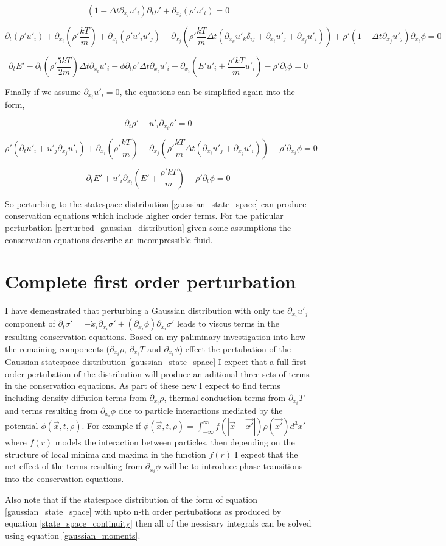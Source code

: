 \documentclass[%
 twocolumn,
 preprint, onecolumn,
 amsmath,amssymb,
 aps,
]{revtex4-1}
\begin{document}
\[
\left(1-\Delta t\partial_{x_i}u'_i\right)\partial_t \rho' + \partial_{x_i}\left(\rho' u'_i\right)=0
\]

\[
\partial_t \left(\rho' u'_i\right) + \partial_{x_i}\left(\rho'\frac{kT}{m}\right) + \partial_{x_j}\left(\rho'u'_iu'_j\right) - \partial_{x_j}\left(\rho'\frac{kT}{m}\Delta t\left(\partial_{x_k}u'_k\delta_{ij} + \partial_{x_i}u'_j + \partial_{x_j}u'_i\right)\right) + \rho'\left(1-\Delta t\partial_{x_j}u'_j\right)\partial_{x_i}\phi = 0
\]

\[
\partial_tE'-\partial_t\left(\rho'\frac{5kT}{2m}\right)\Delta t\partial_{x_i}u'_i-\phi\partial_t\rho'\Delta t\partial_{x_i}u'_i + \partial_{x_i}\left(E'u'_i + \frac{\rho'kT}{m}u'_i\right)-\rho'\partial_t\phi = 0
\]

Finally if we assume $\partial_{x_i}u'_i=0$, the equations can be simplified again into the form,

\[
\partial_t \rho' + u'_i\partial_{x_i}\rho'=0
\]

\[
\rho'\left(\partial_t u'_i + u'_j\partial_{x_j}u'_i\right) + \partial_{x_i}\left(\rho'\frac{kT}{m}\right) - \partial_{x_j}\left(\rho'\frac{kT}{m}\Delta t\left(\partial_{x_i}u'_j + \partial_{x_j}u'_i\right)\right) + \rho'\partial_{x_i}\phi = 0
\]

\[
\partial_tE' + u'_i\partial_{x_i}\left(E' + \frac{\rho'kT}{m}\right)-\rho'\partial_t\phi = 0
\]

So perturbing to the statespace distribution \eqref{gaussian_state_space} can produce conservation equations which include higher order terms. For the paticular perturbation \eqref{perturbed_gaussian_distribution} given some assumptions the conservation equations describe an incompressible fluid.

\section{Complete first order perturbation}
I have demenstrated that perturbing a Gaussian distribution with only the $\partial_{x_i}u'_j$ component of $\partial_t \sigma'=-\dot{x}_i\partial_{x_i}\sigma'+\left(\partial_{x_i}\phi\right)\partial_{\dot{x}_i}\sigma'$ leads to viscus terms in the resulting conservation equations. Based on my paliminary investigation into how the remaining components ($\partial_{x_i}\rho$, $\partial_{x_i}T$ and $\partial_{x_i}\phi$) effect the pertubation of the Gaussian statespace distribution \eqref{gaussian_state_space} I expect that a full first order pertubation of the distribution will produce an aditional three sets of terms in the conservation equations. As part of these new I expect to find terms including density diffution terms from $\partial_{x_i}\rho$, thermal conduction terms from $\partial_{x_i}T$ and terms resulting from $\partial_{x_i}\phi$ due to particle interactions mediated by the potential $\phi\left(\vec{x}, t, \rho\right)$. For example if $\phi\left(\vec{x}, t, \rho\right)=\int_{-\infty}^{\infty}f(|\vec{x}-\vec{x'}|)\rho(\vec{x'})d^3x'$ where $f(r)$ models the interaction between particles, then depending on the structure of local minima and maxima in the function $f(r)$ I expect that the net effect of the terms resulting from $\partial_{x_i}\phi$ will be to introduce phase transitions into the conservation equations.

Also note that if the statespace distribution of the form of equation \eqref{gaussian_state_space} with upto n-th order pertubations as produced by equation \eqref{state_space_continuity} then all of the nessisary integrals can be solved using equation \eqref{gaussian_moments}.
\end{document}
